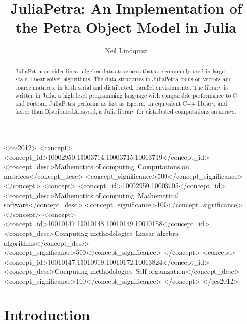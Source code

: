 \documentclass[acmsmall]{acmart}
\title{JuliaPetra: An Implementation of the Petra Object Model in Julia}
\author{Neil Lindquist}
\begin{document}
	
	\begin{CCSXML}
		<ccs2012>
		<concept>
		<concept_id>10002950.10003714.10003715.10003719</concept_id>
		<concept_desc>Mathematics of computing~Computations on matrices</concept_desc>
		<concept_significance>500</concept_significance>
		</concept>
		<concept>
		<concept_id>10002950.10003705</concept_id>
		<concept_desc>Mathematics of computing~Mathematical software</concept_desc>
		<concept_significance>100</concept_significance>
		</concept>
		<concept>
		<concept_id>10010147.10010148.10010149.10010158</concept_id>
		<concept_desc>Computing methodologies~Linear algebra algorithms</concept_desc>
		<concept_significance>500</concept_significance>
		</concept>
		<concept>
		<concept_id>10010147.10010919.10010172.10003824</concept_id>
		<concept_desc>Computing methodologies~Self-organization</concept_desc>
		<concept_significance>100</concept_significance>
		</concept>
		</ccs2012>
	\end{CCSXML}
	
	
	\begin{abstract}
		JuliaPetra provides linear algebra data structures that are commonly used in large scale, linear solver algorithms.
		The data structures in JuliaPetra focus on vectors and sparse matrices, in both serial and
		distributed, parallel environments.
		The library is written in Julia, a high level programming language with comparable performance to C and Fortran.
		JuliaPetra performs as fast as Epetra, an equivalent C++ library, and faster than DistributedArrays.jl, a Julia
		library for distributed computations on arrays.
	\end{abstract}
	
	\maketitle
	
	\section{Introduction}
	
\end{document}
